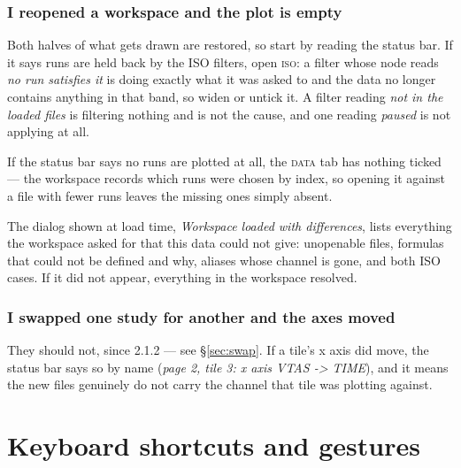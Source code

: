 \documentclass[11pt,a4paper,oneside]{report}
\newcommand{\appver}{2.1.2}
\newcommand{\tab}[1]{\textsc{#1}}
\begin{document}
\subsection{I reopened a workspace and the plot is empty}

Both halves of what gets drawn are restored, so start by reading the status bar.
If it says runs are held back by the ISO filters, open \tab{iso}: a filter whose
node reads \emph{no run satisfies it} is doing exactly what it was asked to and
the data no longer contains anything in that band, so widen or untick it. A
filter reading \emph{not in the loaded files} is filtering nothing and is not
the cause, and one reading \emph{paused} is not applying at all.

If the status bar says no runs are plotted at all, the \tab{data} tab has
nothing ticked --- the workspace records which runs were chosen by index, so
opening it against a file with fewer runs leaves the missing ones simply absent.

The dialog shown at load time, \emph{Workspace loaded with differences}, lists
everything the workspace asked for that this data could not give: unopenable
files, formulas that could not be defined and why, aliases whose channel is
gone, and both ISO cases. If it did not appear, everything in the workspace
resolved.

\subsection{I swapped one study for another and the axes moved}

They should not, since \appver{} --- see \S\ref{sec:swap}. If a tile's x axis
did move, the status bar says so by name (\emph{page 2, tile 3: x axis VTAS ->
TIME}), and it means the new files genuinely do not carry the channel that tile
was plotting against.

\appendix

\chapter{Keyboard shortcuts and gestures}
\end{document}
